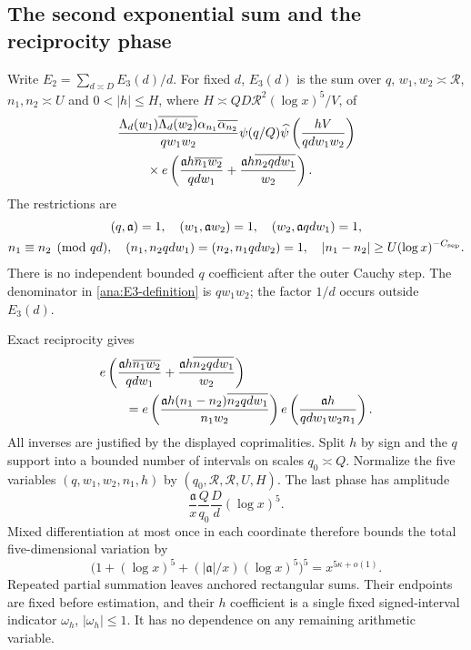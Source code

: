 \subsection{The second exponential sum and the reciprocity phase}

Write $E_2=\sum_{d\asymp D}E_3(d)/d$. For fixed $d$, $E_3(d)$ is the
sum over $q$, $w_1,w_2\asymp\mathcal R$, $n_1,n_2\asymp U$ and
$0<|h|\le H$, where $H\asymp QD\mathcal R^2(\log x)^5/V$, of
\begin{align}
 &\frac{\Lambda_d(w_1)\overline{\Lambda_d(w_2)}
               \alpha_{n_1}\overline{\alpha_{n_2}}}{qw_1w_2}
 \psi(q/Q)\widehat\psi\left(\frac{hV}{qdw_1w_2}\right)\notag\\
 &\hspace{8mm}\times
 e\left(\frac{\mathfrak{a}h\overline{n_1w_2}}{qdw_1}
          +\frac{\mathfrak{a}h\overline{n_2qdw_1}}{w_2}\right).
 \label{ana:E3-definition}
\end{align}
The restrictions are
\[
 \begin{gathered}
 (q,\mathfrak{a})=1,\quad(w_1,\mathfrak{a}w_2)=1,\quad(w_2,\mathfrak{a}qdw_1)=1,\\
 n_1\equiv n_2\pmod{qd},\quad
 (n_1,n_2qdw_1)=(n_2,n_1qdw_2)=1,\quad
 |n_1-n_2|\ge U(\log x)^{-C_{\rm sep}}.
 \end{gathered}
\]
There is no independent bounded $q$ coefficient after the outer Cauchy
step. The denominator in \eqref{ana:E3-definition} is $qw_1w_2$;
the factor $1/d$ occurs outside $E_3(d)$.

Exact reciprocity gives
\begin{align}
 &e\left(\frac{\mathfrak{a}h\overline{n_1w_2}}{qdw_1}
          +\frac{\mathfrak{a}h\overline{n_2qdw_1}}{w_2}\right)\notag\\
 &\qquad=
 e\left(\frac{\mathfrak{a}h(n_1-n_2)\overline{n_2qdw_1}}{n_1w_2}\right)
 e\left(\frac{\mathfrak{a}h}{qdw_1w_2n_1}\right).
 \label{eq:current-retained-phase}
\end{align}
All inverses are justified by the displayed coprimalities. Split $h$
by sign and the $q$ support into a bounded number of intervals on scales
$q_0\asymp Q$. Normalize the five variables
$(q,w_1,w_2,n_1,h)$ by $(q_0,\mathcal R,\mathcal R,U,H)$.
The last phase has amplitude
\[
 \frac{\mathfrak{a}}{x}\frac Q{q_0}\frac Dd(\log x)^5.
\]
Mixed differentiation at most once in each coordinate therefore bounds
the total five-dimensional variation by
\begin{equation}
 \bigl(1+(\log x)^5+(|\mathfrak{a}|/x)(\log x)^5\bigr)^5
       =x^{5\kappa+o(1)}.
 \label{ana:phase-variation}
\end{equation}
Repeated partial summation leaves anchored rectangular sums. Their
endpoints are fixed before estimation, and their $h$ coefficient is a
single fixed signed-interval indicator $\omega_h$, $|\omega_h|\le1$.
It has no dependence on any remaining arithmetic variable.

